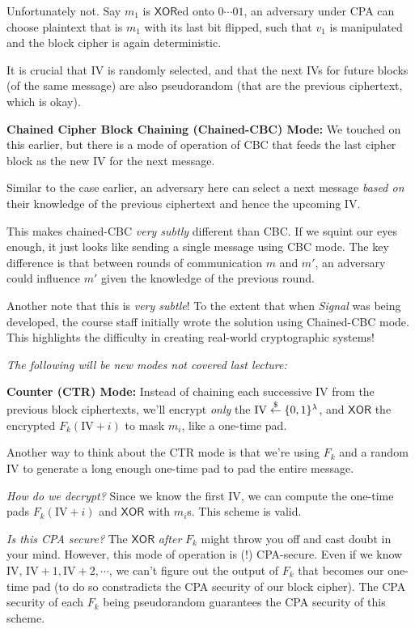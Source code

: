 Unfortunately not. Say $m_1$ is $\mathsf{XOR}$ed onto $0\cdots 01$, an adversary under CPA can choose plaintext that is $m_1$ with its last bit flipped, such that $v_1$ is manipulated and the block cipher is again deterministic.

It is crucial that IV is randomly selected, and that the next IVs for future blocks (of the same message) are also pseudorandom (that are the previous ciphertext, which is okay).

\textbf{Chained Cipher Block Chaining (Chained-CBC) Mode:} We touched on this earlier, but there is a mode of operation of CBC that feeds the last cipher block as the new IV for the next message.


Similar to the case earlier, an adversary here can select a next message \emph{based on} their knowledge of the previous ciphertext and hence the upcoming IV.

This makes chained-CBC \emph{very subtly} different than CBC. If we squint our eyes enough, it just looks like sending a single message using CBC mode. The key difference is that between rounds of communication $m$ and $m'$, an adversary could influence $m'$ given the knowledge of the previous round.

\begin{remark*}
    Another note that this is \emph{very subtle}! To the extent that when \emph{Signal} was being developed, the course staff initially wrote the solution using Chained-CBC mode. This highlights the difficulty in creating real-world cryptographic systems!
\end{remark*}

\emph{The following will be new modes not covered last lecture:}

\textbf{Counter (CTR) Mode:} Instead of chaining each successive IV from the previous block ciphertexts, we'll encrypt \emph{only} the $\mathrm{IV}\overset{\$}{\leftarrow} \{0, 1\}^\lambda$, and $\mathsf{XOR}$ the encrypted $F_k(\mathrm{IV}+i)$ to mask $m_i$, like a one-time pad.

Another way to think about the CTR mode is that we're using $F_k$ and a random IV to generate a long enough one-time pad to pad the entire message.


\emph{How do we decrypt?} Since we know the first IV, we can compute the one-time pads $F_k(\mathrm{IV} + i)$ and $\mathsf{XOR}$ with $m_i$s. This scheme is valid.

\emph{Is this CPA secure?} The $\mathsf{XOR}$ \emph{after} $F_k$ might throw you off and cast doubt in your mind. However, this mode of operation is (!) CPA-secure. Even if we know IV, $\mathrm{IV}+1, \mathrm{IV}+2, \cdots$, we can't figure out the output of $F_k$ that becomes our one-time pad (to do so constradicts the CPA security of our block cipher). The CPA security of each $F_k$ being pseudorandom guarantees the CPA security of this scheme.

